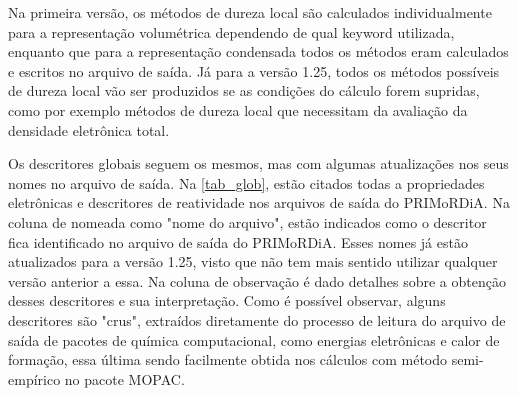 \documentclass[a4paper,11pt]{refart}
\begin{document}
Na primeira versão, os métodos de dureza local são calculados individualmente para a representação volumétrica dependendo de qual keyword utilizada, enquanto que para a representação condensada todos os métodos eram calculados e escritos no arquivo de saída. Já para a versão 1.25, todos os métodos possíveis de dureza local vão ser produzidos se as condições do cálculo forem supridas, como por exemplo métodos de dureza local que necessitam da avaliação da densidade eletrônica total. 

Os descritores globais seguem os mesmos, mas com algumas atualizações nos seus nomes no arquivo de saída. Na \autoref{tab_glob}, estão citados todas a propriedades eletrônicas e descritores de reatividade nos arquivos de saída do PRIMoRDiA. Na coluna de nomeada como "nome do arquivo", estão indicados como o descritor fica identificado no arquivo de saída do PRIMoRDiA. Esses nomes já estão atualizados para a versão 1.25, visto que não tem mais sentido utilizar qualquer versão anterior a essa. Na coluna de observação é dado detalhes sobre a obtenção desses descritores e sua interpretação. Como é possível observar, alguns descritores são "crus", extraídos diretamente do processo de leitura do arquivo de saída de pacotes de química computacional, como energias eletrônicas e calor de formação, essa última sendo facilmente obtida nos cálculos com método semi-empírico no pacote MOPAC.
\end{document}
